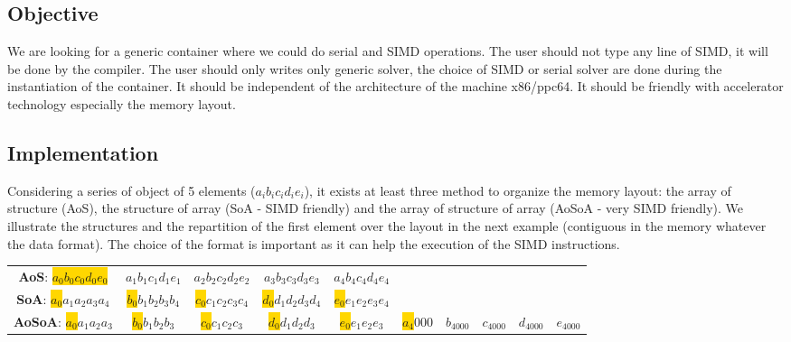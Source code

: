 \documentclass[11pt]{amsart}
\begin{document}
\subsection*{Objective}

We are looking for a generic container where we could do serial and SIMD operations. The user should not type any line of SIMD, it will be done by the compiler. The user should only writes only generic solver, the choice of SIMD or serial solver 
are done during the instantiation of the container. It should be independent of the architecture of the machine x86/ppc64.  It should be friendly  with accelerator technology especially the memory layout.

\subsection*{Implementation} Considering a series of object of 5 elements ($a_i b_i c_i d_i e_i$), it exists at least three method to organize the memory layout: the array of structure (AoS), the structure of array (SoA - SIMD friendly) and the array of structure of array (AoSoA - very SIMD friendly). We illustrate the structures and the repartition of the first element over the layout in the next example (contiguous in the memory whatever the data format). The choice of the format is important as it can help the execution of the SIMD instructions.
\vspace{0.2cm}
\begin{center}
\tiny{
\begin{tabular}{ c  c  c  c  c c c c c c}
 \textbf{AoS}:  \colorbox{gold}{$a_0 b_0 c_0 d_0 e_0$} &  $a_1 b_1 c_1 d_1 e_1$ & $a_2 b_2 c_2 d_2 e_2$ & $a_3 b_3 c_3 d_3 e_3$ & $a_4 b_4 c_4 d_4 e_4$  &&&&& \\

 \textbf{SoA}:  \colorbox{gold}{$a_0$}$a_1 a_2 a_3 a_4$ &   \colorbox{gold}{$b_0$}$ b_1 b_2 b_3 b_4$ &  \colorbox{gold}{$c_0$}$ c_1 c_2 c_3 c_4$ &  \colorbox{gold}{$d_0$}$d_1 d_2 d_3 d_4$ &  \colorbox{gold}{$e_0$}$e_1 e_2 e_3 e_4$ &&&&& \\

 \textbf{AoSoA}:  \colorbox{gold}{$a_0$}$a_1 a_2 a_3$ &   \colorbox{gold}{$b_0$}$ b_1 b_2 b_3$ &  \colorbox{gold}{$c_0$}$ c_1 c_2 c_3$ &  \colorbox{gold}{$d_0$}$d_1 d_2 d_3$ &  \colorbox{gold}{$e_0$}$e_1 e_2 e_3$   & \colorbox{gold}{$a_4$}$000$ &   $b_4000$ &  $c_4000$ &  $d_4000$ &  $e_4000$  \\
\end{tabular}}
\end{center}
\vspace{0.2cm}
\end{document}
